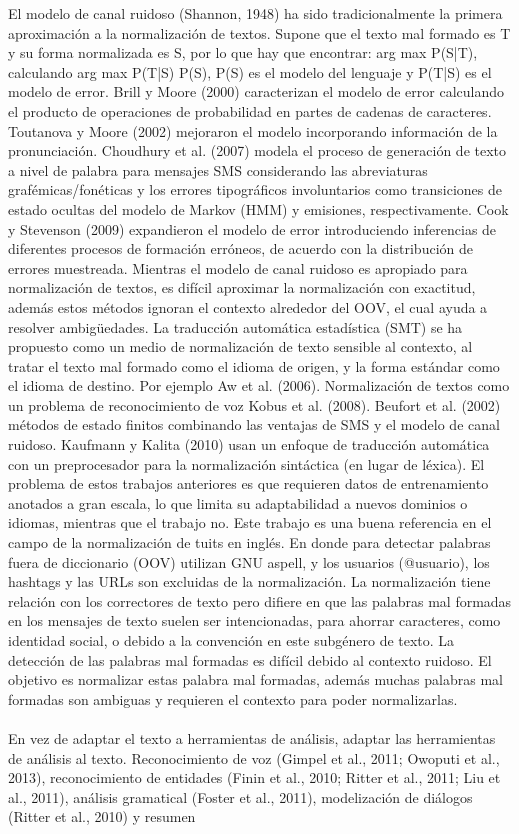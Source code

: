 \documentclass[14pt]{extarticle}
\theoremstyle{definition}
\theoremstyle{remark}
\begin{document}
El modelo de canal ruidoso (Shannon, 1948) ha sido tradicionalmente la primera aproximación a la normalización de textos. Supone que el texto mal formado es T y su forma normalizada es S, por lo que hay que encontrar: arg max P(S|T), calculando arg max P(T|S) P(S), P(S) es el modelo del lenguaje y P(T|S) es el modelo de error. Brill y Moore (2000) caracterizan el modelo de error calculando el producto de operaciones de probabilidad en partes de cadenas de caracteres. Toutanova y Moore (2002) mejoraron el modelo incorporando información de la pronunciación. Choudhury et al. (2007) modela el proceso de generación de texto a nivel de palabra para mensajes SMS considerando las abreviaturas grafémicas/fonéticas y los errores tipográficos involuntarios como transiciones de estado ocultas del modelo de Markov (HMM) y emisiones, respectivamente. Cook y Stevenson (2009) expandieron el modelo de error introduciendo inferencias de diferentes procesos de formación erróneos, de acuerdo con la distribución de errores muestreada. Mientras el modelo de canal ruidoso es apropiado para normalización de textos, es difícil aproximar la normalización con exactitud, además estos métodos ignoran el contexto alrededor del OOV, el cual ayuda a resolver ambigüedades. La traducción automática estadística (SMT) se ha propuesto como un medio de normalización de texto sensible al contexto, al tratar el texto mal formado como el idioma de origen, y la forma estándar como el idioma de destino. Por ejemplo Aw et al. (2006). Normalización de textos como un problema de reconocimiento de voz Kobus et al. (2008). Beufort et al. (2002) métodos de estado finitos combinando las ventajas de SMS y el modelo de canal ruidoso. Kaufmann y Kalita (2010) usan un enfoque de traducción automática con un preprocesador para la normalización sintáctica (en lugar de léxica). El problema de estos trabajos anteriores es que requieren datos de entrenamiento anotados a gran escala, lo que limita su adaptabilidad a nuevos dominios o idiomas, mientras que el trabajo \citep{baldwin:2011} no. Este trabajo es una buena referencia en el campo de la normalización de tuits en inglés. En donde para detectar palabras fuera de diccionario (OOV) utilizan GNU aspell, y los usuarios (@usuario), los hashtags y las URLs son excluidas de la normalización. La normalización tiene relación con los correctores de texto \citep{peterson:1980} pero difiere en que las palabras mal formadas en los mensajes de texto suelen ser intencionadas, para ahorrar caracteres, como identidad social, o debido a la convención en este subgénero de texto. La detección de las palabras mal formadas es difícil debido al contexto ruidoso. El objetivo es normalizar estas palabra mal formadas, además muchas palabras mal formadas son ambiguas y requieren el contexto para poder normalizarlas.\\\\En vez de adaptar el texto a herramientas de análisis, adaptar las herramientas de análisis al texto. Reconocimiento de voz (Gimpel et al., 2011; Owoputi et al., 2013), reconocimiento de entidades (Finin et al., 2010; Ritter et al., 2011; Liu et al., 2011), análisis gramatical (Foster et al., 2011), modelización de diálogos (Ritter et al., 2010) y resumen 
\end{document}
